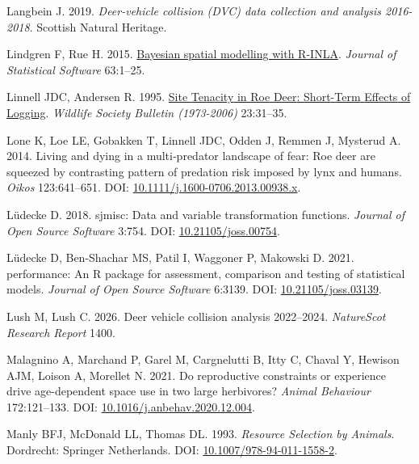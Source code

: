 \documentclass[10pt,a4paper]{article}
\newlength{\cslhangindent}
\newenvironment{CSLReferences}[2] %
 {\begin{list}{}{%
  \setlength{\itemindent}{0pt}
  \setlength{\leftmargin}{0pt}
  \setlength{\parsep}{0pt}
  \ifodd #1
   \setlength{\leftmargin}{\cslhangindent}
   \setlength{\itemindent}{-1\cslhangindent}
  \fi
  \setlength{\itemsep}{#2\baselineskip}}}
 {\end{list}}
\begin{document}
\begin{CSLReferences}{1}{0}
Langbein J. 2019. \emph{Deer-vehicle collision (DVC) data collection and analysis 2016-2018}. Scottish Natural Heritage.

Lindgren F, Rue H. 2015. \href{http://www.jstatsoft.org/v63/i19/}{Bayesian spatial modelling with {R}-{INLA}}. \emph{Journal of Statistical Software} 63:1--25.

Linnell JDC, Andersen R. 1995. \href{http://www.jstor.org/stable/3783190}{Site {Tenacity} in {Roe} {Deer}: {Short}-{Term} {Effects} of {Logging}}. \emph{Wildlife Society Bulletin (1973-2006)} 23:31--35.

Lone K, Loe LE, Gobakken T, Linnell JDC, Odden J, Remmen J, Mysterud A. 2014. Living and dying in a multi‐predator landscape of fear: Roe deer are squeezed by contrasting pattern of predation risk imposed by lynx and humans. \emph{Oikos} 123:641--651. DOI: \href{https://doi.org/10.1111/j.1600-0706.2013.00938.x}{10.1111/j.1600-0706.2013.00938.x}.

Lüdecke D. 2018. {sjmisc}: Data and variable transformation functions. \emph{Journal of Open Source Software} 3:754. DOI: \href{https://doi.org/10.21105/joss.00754}{10.21105/joss.00754}.

Lüdecke D, Ben-Shachar MS, Patil I, Waggoner P, Makowski D. 2021. {performance}: An {R} package for assessment, comparison and testing of statistical models. \emph{Journal of Open Source Software} 6:3139. DOI: \href{https://doi.org/10.21105/joss.03139}{10.21105/joss.03139}.

Lush M, Lush C. 2026. Deer vehicle collision analysis 2022--2024. \emph{NatureScot Research Report} 1400.

Malagnino A, Marchand P, Garel M, Cargnelutti B, Itty C, Chaval Y, Hewison AJM, Loison A, Morellet N. 2021. Do reproductive constraints or experience drive age-dependent space use in two large herbivores? \emph{Animal Behaviour} 172:121--133. DOI: \href{https://doi.org/10.1016/j.anbehav.2020.12.004}{10.1016/j.anbehav.2020.12.004}.

Manly BFJ, McDonald LL, Thomas DL. 1993. \emph{Resource {Selection} by {Animals}}. Dordrecht: Springer Netherlands. DOI: \href{https://doi.org/10.1007/978-94-011-1558-2}{10.1007/978-94-011-1558-2}.


\end{CSLReferences}
\end{document}
